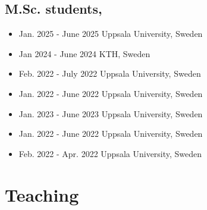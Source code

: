 \documentclass[10pt,A4]{article} %
\begin{document}
  \subsection{\noindent M.Sc.  students,   }
  \begin{itemize}
    
        \item {}
        { Jan. 2025 - June 2025 }
        { Uppsala University, Sweden }
        {  }
     
        \item {}
        { Jan 2024 - June 2024 }
        { KTH, Sweden }
        {  }
     
        \item {}
        { Feb. 2022 - July 2022 }
        { Uppsala University, Sweden }
        {  }
     
        \item {}
        { Jan. 2022 - June 2022 }
        { Uppsala University, Sweden }
        {  }
     
        \item {}
        { Jan. 2023 - June 2023 }
        { Uppsala University, Sweden }
        {  }
     
        \item {}
        { Jan. 2022 - June 2022 }
        { Uppsala University, Sweden }
        {  }
     
        \item {}
        { Feb. 2022 - Apr. 2022 }
        { Uppsala University, Sweden }
        {  }
     
  \end{itemize}



\section{Teaching}
\end{document}
